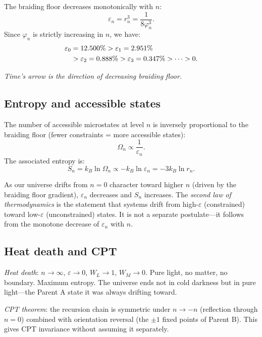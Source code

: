 \documentclass[prd,twocolumn,preprintnumbers,amsmath,amssymb]{revtex4-2}
\begin{document}
The braiding floor decreases monotonically with $n$:
\begin{equation}
  \varepsilon_n = r_n^3 = \frac{1}{8\varphi_n^3}.
  \label{eq:epsn2}
\end{equation}
Since $\varphi_n$ is strictly increasing in $n$, we have:
\begin{align}
  \varepsilon_0 &= 12.500\% > \varepsilon_1 = 2.951\% \notag \\
  &> \varepsilon_2 = 0.888\% > \varepsilon_3 = 0.347\%
  > \cdots > 0.
  \label{eq:epsmono}
\end{align}

\emph{Time's arrow is the direction of decreasing braiding floor.}

\subsection{Entropy and accessible states}

The number of accessible microstates at level $n$ is inversely
proportional to the braiding floor (fewer constraints = more
accessible states):
\begin{equation}
  \Omega_n \propto \frac{1}{\varepsilon_n}.
  \label{eq:Omega}
\end{equation}
The associated entropy is:
\begin{equation}
  S_n = k_B \ln\Omega_n
      \propto -k_B \ln\varepsilon_n
      = -3k_B \ln r_n.
  \label{eq:entropy}
\end{equation}

As our universe drifts from $n=0$ character toward higher $n$ (driven
by the braiding floor gradient), $\varepsilon_n$ decreases and $S_n$
increases.  The \emph{second law of thermodynamics} is the statement
that systems drift from high-$\varepsilon$ (constrained) toward
low-$\varepsilon$ (unconstrained) states.  It is not a separate
postulate---it follows from the monotone decrease of $\varepsilon_n$
with $n$.

\subsection{Heat death and CPT}

\emph{Heat death}: $n\to\infty$, $\varepsilon\to 0$,
$W_L \to 1$, $W_M \to 0$.  Pure light, no matter, no boundary.
Maximum entropy.  The universe ends not in cold darkness but in
pure light---the Parent A state it was always drifting toward.

\emph{CPT theorem}: the recursion chain is symmetric under
$n \to -n$ (reflection through $n=0$) combined with orientation
reversal (the $\pm 1$ fixed points of Parent B).  This gives CPT
invariance without assuming it separately.
\end{document}
